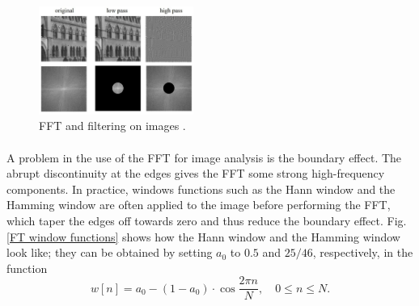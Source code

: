 \documentclass[12pt, twocolumn]{report}
\begin{document}
\begin{figure}[htbp]
    \centering
    \includegraphics[width=0.45\textwidth]{Figures/FT FFT on images cropped.jpg}
    \caption{FFT and filtering on images \cite{FT lecture}.}
    \label{FT FFT on images}
\end{figure}

\paragraph{}
A problem in the use of the FFT for image analysis is the boundary effect. The abrupt discontinuity at the edges gives the FFT some strong high-frequency components. In practice, windows functions such as the Hann window and the Hamming window are often applied to the image before performing the FFT, which taper the edges off towards zero and thus reduce the boundary effect. Fig. \ref{FT window functions} shows how the Hann window and the Hamming window look like; they can be obtained by setting $a_0$ to $0.5$ and $25/46$, respectively, in the function
\begin{equation}
    w[n] = a_0 - (1-a_0)\cdot \cos{\frac{2\pi n}{N}}, \quad 0\leq n \leq N.
\end{equation}
\end{document}
